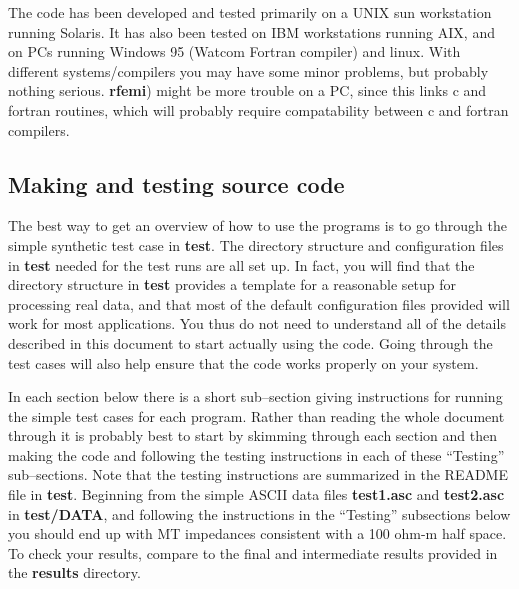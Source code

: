 The code has been developed and tested primarily on a UNIX 
sun workstation  running Solaris.  It has also been tested on
IBM workstations running AIX, and on PCs running Windows 95
(Watcom Fortran compiler) and linux.  With different systems/compilers
you may have some minor problems, but probably nothing serious.
{\bf rfemi}) might be more trouble on a PC, since this links
c and fortran routines, which will probably require compatability
between c and fortran compilers.

\subsection{Making and testing source code}

The best way to get an overview of how to use the programs
is to go through the simple synthetic test case in {\bf test}.
The directory structure and
configuration files in {\bf test} needed for the test runs are
all set up.  In fact, you will find that the directory
structure in {\bf test} provides a
template for a reasonable setup for processing real data,
and that most of the default configuration files provided
will work for most applications.
You thus do not need to understand all
of the details described in this document to start actually using the code.
Going through the test cases will also help ensure that the
code works properly on your system.

In each section below there is a short sub--section giving
instructions for running the simple
test cases for each program.  Rather than reading the whole document through
it is probably best to start by skimming through each section
and then making the code and following the
testing instructions in each of these ``Testing'' sub--sections.
Note that the testing instructions are summarized in the 
README file in {\bf test}.
Beginning from the simple ASCII data files
{\bf test1.asc} and {\bf test2.asc} in {\bf test/DATA},
and following the instructions in the ``Testing''
subsections below
you should end up with MT impedances
consistent with a 100 ohm-m half space.
To check your results, compare to the final and intermediate results 
provided in the {\bf results} directory.

